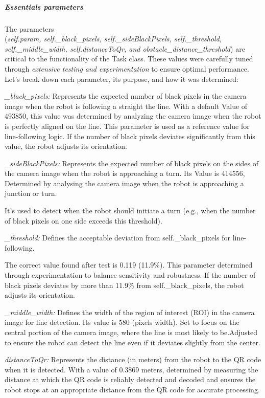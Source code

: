 \documentclass[../../main]{subfiles}
\begin{document}
\newpage

\subparagraph{Essentials parameters}

The parameters \\ (\emph{self.param, self.\_black\_pixels,
self.\_sideBlackPixels, self.\_threshold, self.\_middle\_width,
self.distanceToQr, and obstacle\_distance\_threshold}) are critical to
the functionality of the Task class. These values were carefully tuned
through \emph{extensive testing and experimentation} to ensure optimal
performance. Let's break down each parameter, its purpose, and how it
was determined:

\emph{\_black\_pixels:} Represents the expected number of black pixels
in the camera image when the robot is following a straight the line.
With a default Value of 493850, this value was determined by analyzing
the camera image when the robot is perfectly aligned on the line. This
parameter is used as a reference value for line-following logic. If the
number of black pixels deviates significantly from this value, the robot
adjusts its orientation.

\emph{\_sideBlackPixels:} Represents the expected number of black pixels
on the sides of the camera image when the robot is approaching a turn.
Its Value is 414556, Determined by analysing the camera image when the
robot is approaching a junction or turn.

It's used to detect when the robot should initiate a turn (e.g., when
the number of black pixels on one side exceeds this threshold).

\emph{\_threshold:} Defines the acceptable deviation from
self.\_black\_pixels for line-following.

The correct value found after test is 0.119 (11.9\%). This parameter
determined through experimentation to balance sensitivity and
robustness. If the number of black pixels deviates by more than 11.9\%
from self.\_black\_pixels, the robot adjusts its orientation.

\emph{\_middle\_width:} Defines the width of the region of interest
(ROI) in the camera image for line detection. Its value is 580 (pixels
width)\emph{.} Set to focus on the central portion of the camera image,
where the line is most likely to be.Adjusted to ensure the robot can
detect the line even if it deviates slightly from the center.

\emph{distanceToQr:} Represents the distance (in meters) from the robot
to the QR code when it is detected. With a value of 0.3869 meters,
determined by measuring the distance at which the QR code is reliably
detected and decoded and ensures the robot stops at an appropriate
distance from the QR code for accurate processing.
\end{document}
